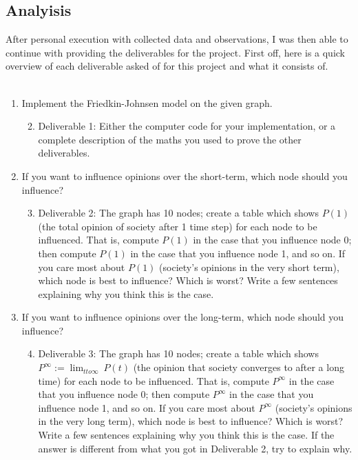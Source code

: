 \documentclass[letterpaper]{article}
\begin{document}
\subsection{Analyisis}
After personal execution with collected data and observations, I was then able to continue with providing the deliverables for the project.  First off, here is a quick overview of each deliverable asked of for this project and what it consists of.\\\\
\begin{enumerate}
	\item Implement the Friedkin-Johnsen model on the given graph. 
	\begin{enumerate}
		\setcounter{enumi}{1}
		\item  Deliverable 1: Either the computer code for your implementation, or a complete description of the maths you used to prove the other deliverables. 
	\end{enumerate}
	\item If you want to influence opinions over the short-term, which node should you influence?
	\begin{enumerate}
		\setcounter{enumi}{2}
		\item  Deliverable 2: The graph has 10 nodes; create a table which shows $P(1)$ (the total opinion of society after 1 time step) for each node to be influenced. That is, compute $P(1)$ in the case that you influence node 0; then compute $P(1)$ in the case that you influence node 1, and so on. If you care most about $P(1)$ (society’s opinions in the very short term), which node is best to influence? Which is worst? Write a few sentences explaining why you think this is the case.
	\end{enumerate}
	\item If you want to influence opinions over the long-term, which node should you influence?	
	\begin{enumerate}
		\setcounter{enumi}{3}
		\item Deliverable 3: The graph has 10 nodes; create a table which shows $P^\infty := \lim_{t to \infty} \ P(t)$ (the opinion that society converges to after a long time) for each node to be influenced. That is, compute $P^\infty$ in the case that you influence node 0; then compute $P^\infty$ in the case that you influence node 1, and so on. If you care most about $P^\infty$ (society’s opinions in the very long term), which node is best to influence? Which is worst? Write a few sentences explaining why you think this is the case. If the answer is different from what you got in Deliverable 2, try to explain why.\\\\
	\end{enumerate}
\end{enumerate}
\end{document}
